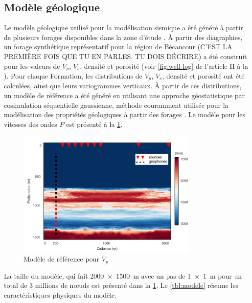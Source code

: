 \subsection{Modèle géologique}
Le modèle géologique utilisé pour la modélisation sismique a été généré à partir de plusieurs forages disponibles dans la zone d'étude \citep{Claprood2012,TranNgoc2014}. À partir des diagraphies, un forage synthétique représentatif pour la région de Bécancour (C'EST LA PREMIÈRE FOIS QUE TU EN PARLES. TU DOIS DÉCRIRE) a été construit pour les valeurs de $V_p$, $V_s$, densité et porosité (voir \cref{fig:well-log} de l'article II à la ). Pour chaque Formation, les distributions de $V_p$, $V_s$, densité et porosité ont été calculées, ainsi que leurs variogrammes verticaux. À partir de ces distributions, un modèle de référence a été généré en utilisant une approche géostatistique par cosimulation séquentielle gaussienne, méthode couramment utilisée pour la modélisation des propriétés géologiques à partir des forages \citep{Deutsch1998,Doyen2007}. Le modèle pour les vitesses des ondes $P$ est présenté à la \cref{fig:mod_ref_vp}.
\begin{figure}[ht]
\centering
\includegraphics[width=0.8\textwidth]{fig/mod_ref_vp.pdf}
\caption{Modèle de référence pour $V_p$}
\label{fig:mod_ref_vp}
\end{figure}
La taille du modèle, qui fait \SI{2000 x 1500}{\metre} avec un pas de \SI{1 x 1}{\metre} pour un total de \num{3} millions de nœuds est présenté dans la \cref{fig:mod_ref_vp}. Le \cref{tbl:modele} résume les caractéristiques physiques du modèle.
